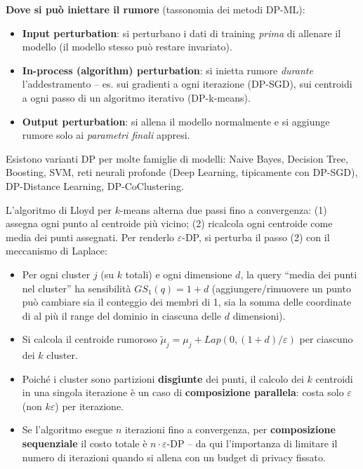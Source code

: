 \documentclass[a4paper,11pt]{article}
\begin{document}
\textbf{Dove si pu\`{o} iniettare il rumore} (tassonomia dei metodi DP-ML):
\begin{itemize}
  \item \textbf{Input perturbation}: si perturbano i dati di training \emph{prima} di allenare il modello (il modello stesso pu\`{o} restare invariato).
  \item \textbf{In-process (algorithm) perturbation}: si inietta rumore \emph{durante} l'addestramento -- es. sui gradienti a ogni iterazione (DP-SGD), sui centroidi a ogni passo di un algoritmo iterativo (DP-k-means).
  \item \textbf{Output perturbation}: si allena il modello normalmente e si aggiunge rumore solo ai \emph{parametri finali} appresi.
\end{itemize}
Esistono varianti DP per molte famiglie di modelli: Naive Bayes, Decision Tree, Boosting, SVM, reti neurali profonde (Deep Learning, tipicamente con DP-SGD), DP-Distance Learning, DP-CoClustering.

\begin{esempio}
L'algoritmo di Lloyd per $k$-means alterna due passi fino a convergenza: (1) assegna ogni punto al centroide pi\`{u} vicino; (2) ricalcola ogni centroide come media dei punti assegnati. Per renderlo $\varepsilon$-DP, si perturba il passo (2) con il meccanismo di Laplace:
\begin{itemize}
  \item Per ogni cluster $j$ (su $k$ totali) e ogni dimensione $d$, la query ``media dei punti nel cluster'' ha sensibilit\`{a} $GS_1(q) = 1+d$ (aggiungere/rimuovere un punto pu\`{o} cambiare sia il conteggio dei membri di 1, sia la somma delle coordinate di al pi\`{u} il range del dominio in ciascuna delle $d$ dimensioni).
  \item Si calcola il centroide rumoroso $\tilde{\mu}_j = \mu_j + Lap(0, (1+d)/\varepsilon)$ per ciascuno dei $k$ cluster.
  \item Poich\'{e} i cluster sono partizioni \textbf{disgiunte} dei punti, il calcolo dei $k$ centroidi in una singola iterazione \`{e} un caso di \textbf{composizione parallela}: costa solo $\varepsilon$ (non $k\varepsilon$) per iterazione.
  \item Se l'algoritmo esegue $n$ iterazioni fino a convergenza, per \textbf{composizione sequenziale} il costo totale \`{e} $n \cdot \varepsilon$-DP -- da qui l'importanza di limitare il numero di iterazioni quando si allena con un budget di privacy fissato.
\end{itemize}
\end{esempio}
\end{document}
